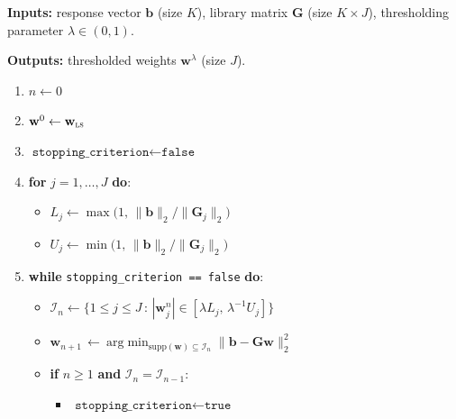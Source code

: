 \documentclass[journal=gmj]{CUP-JNL-DTM}%
\theoremstyle{definition}
\numberwithin{equation}{section}
\begin{document}
\begin{appendix}

{\color{black}
\begin{algorithm}
    {\color{black}
    \caption{Modified Sequential Thresholding Least Squares ($\texttt{MSTLS}$)}\label{algorthim:MSTLS}
    \textbf{Inputs:} response vector $\mathbf{b}$ (size $K$), library matrix $\mathbf{G}$ (size $K \times J$), thresholding parameter $\lambda \in (0,1)$.

    \textbf{Outputs:} thresholded weights $\mathbf{w}^{\lambda}$ (size $J$).
    
    \vspace{-2mm} \hrulefill \vspace{-2mm}
    \begin{enumerate}
        \item $n \leftarrow 0$
        
        \item $\mathbf{w}^0 \leftarrow \mathbf{w}_{\textsc{ls}}$

        \item $\texttt{stopping\_criterion} \leftarrow \texttt{false}$

        \item \textbf{for} $j = 1, \dots, J$ \textbf{do}: \begin{itemize}
            \item $L_j \leftarrow \max\big(1, \, \|\mathbf{b}\|_2/\| \mathbf{G}_j \|_2\big)$

            \item $U_j \leftarrow \min\big(1, \, \|\mathbf{b}\|_2/\| \mathbf{G}_j \|_2\big)$
        \end{itemize}

        \item \textbf{while} \texttt{stopping\_criterion == false} \textbf{do}: \begin{itemize}
            \item $\mathcal{I}_{n} \leftarrow \big\{ 1 \leq j \leq J \, : \, |\mathbf{w}^n_j| \in [\lambda L_j, \, \lambda^{-1} U_j] \big\}$
            
            \item $\mathbf{w}_{n+1} \, \leftarrow \ \text{arg}\!\min_{\text{supp}(\mathbf{w}) \subseteq \mathcal{I}_n} \|\mathbf{b} - \mathbf{Gw}\|^2_2$

            \item \textbf{if} $n \geq 1$ \textbf{and} $\mathcal{I}_{n} = \mathcal{I}_{n-1}$: \begin{itemize}
                \item[$\circ$] $\texttt{stopping\_criterion} \leftarrow \texttt{true}$


\end{itemize}
\end{itemize}
\end{enumerate}}
\end{algorithm}}
\end{appendix}
\end{document}
